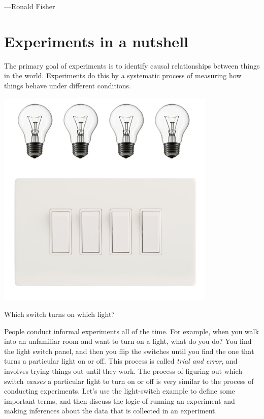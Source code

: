  {---Ronald Fisher}

\section{Experiments in a nutshell}

The primary goal of experiments is to identify causal relationships between things in the world. Experiments do this by a systematic process of measuring how things behave under different conditions.

\begin{marginfigure}[0in]
\includegraphics[width=\linewidth]{figures/lightswitch.png}
\caption{Which switch turns on which light?}
\label{fig:confound}
\end{marginfigure}

People conduct informal experiments all of the time. For example, when you walk into an unfamiliar room and want to turn on a light, what do you do? You find the light switch panel, and then you flip the switches until you find the one that turns a particular light on or off. This process is called \emph{trial and error}, and involves trying things out until they work. The process of  figuring out which switch \emph{causes} a particular light to turn on or off is very similar to the process of conducting experiments. Let's use the light-switch example to define some important terms, and then discuss the logic of running an experiment and making inferences about the data that is collected in an experiment.

